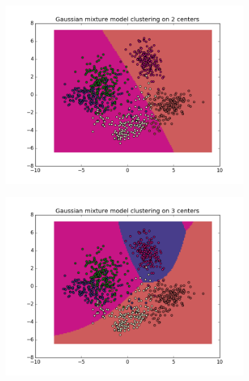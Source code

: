 \documentclass{article}
\begin{document}
											\begin{center}
				\begin{figure}
\centering
        \begin{subfigure}[b]{0.48\textwidth}
                \centering
                \includegraphics[width=\linewidth]{figure_10}
        \end{subfigure}\hfill
        \begin{subfigure}[b]{0.48\textwidth}
                \centering
                \includegraphics[width=\linewidth]{figure_11}
        \end{subfigure}\hfill
 \label{fig:5}
 \end{figure}
       

\end{center}
\end{document}
